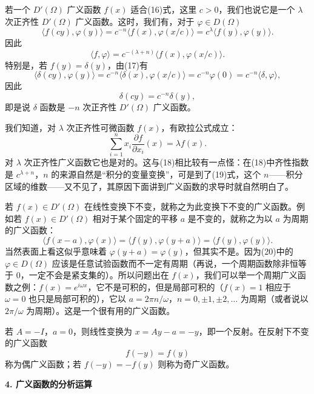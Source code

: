 若一个 $D'(\Omega)$ 广义函数 $f(x)$ 适合(16)式，这里 $c>0$，我们也说它是一个 $\lambda$ 次正齐性 $D'(\Omega)$ 广义函数。这时，我们有，对于 $\varphi\in D(\Omega)$
\begin{equation}
 \langle f(cy),\varphi(y)\rangle
 =c^{-n}\langle f(x),\varphi(x/c)\rangle
 =c^\lambda\langle f(y),\varphi(y)\rangle.
 \tag{17}
\end{equation}
因此
\begin{equation}
 \langle f,\varphi\rangle
 =c^{-(\lambda+n)}\langle f(x),\varphi(x/c)\rangle.
 \tag{18}
\end{equation}
特别是，若 $f(y)=\delta(y)$，由(17)有
\[
 \langle\delta(cy),\varphi(y)\rangle
 =c^{-n}\langle\delta(x),\varphi(x/c)\rangle
 =c^{-n}\varphi(0)=c^{-n}\langle\delta,\varphi\rangle,
\]
因此
\[
 \delta(cy)=c^{-n}\delta(y),
\]
即是说 $\delta$ 函数是 $-n$ 次正齐性 $D'(\Omega)$ 广义函数。

我们知道，对 $\lambda$ 次正齐性可微函数 $f(x)$，有欧拉公式成立：
\begin{equation}
 \sum_{i=1}^n x_i\frac{\partial f}{\partial x_i}(x)=\lambda f(x).
 \tag{19}
\end{equation}
对 $\lambda$ 次正齐性广义函数它也是对的。这与(18)相比较有一点怪：在(18)中齐性指数是 $c^{\lambda+n}$，$n$ 的来源自然是“积分的变量变换”，可是到了(19)式，这个 $n$——积分区域的维数——又不见了，其原因下面讲到广义函数的求导时就自然明白了。

若 $f(x)\in D'(\Omega)$ 在线性变换下不变，就称之为此变换下不变的广义函数。例如若 $f(x)\in D'(\Omega)$ 相对于某个固定的平移 $a$ 是不变的，就称之为以 $a$ 为周期的广义函数：
\begin{equation}
 \langle f(x-a),\varphi(x)\rangle
 =\langle f(y),\varphi(y+a)\rangle
 =\langle f(y),\varphi(y)\rangle.
 \tag{20}
\end{equation}
当然表面上看这似乎意味着 $\varphi(y+a)=\varphi(y)$，但其实不是。因为(20)中的 $\varphi\in D(\Omega)$ 应该是任意试验函数而不一定有周期（再说，一个周期函数除非恒等于 0，一定不会是紧支集的）。所以问题出在 $f(x)$，我们可以举一个周期广义函数之例：$f(x)=e^{i\omega x}$，它不是可积的，但是局部可积的（$f(x)=1$ 相应于 $\omega=0$ 也只是局部可积的），它以 $a=2\pi n/\omega$，$n=0,\pm1,\pm2,\ldots$ 为周期（或者说以 $2\pi/\omega$ 为周期）。这是一个很有用的广义函数。

若 $A=-I$，$a=0$，则线性变换为 $x=Ay-a=-y$，即一个反射。在反射下不变的广义函数
\[
 f(-y)=f(y)
\]
称为偶广义函数；若 $f(-y)=-f(y)$ 则称为奇广义函数。

\medskip
\noindent\textbf{4. 广义函数的分析运算}

